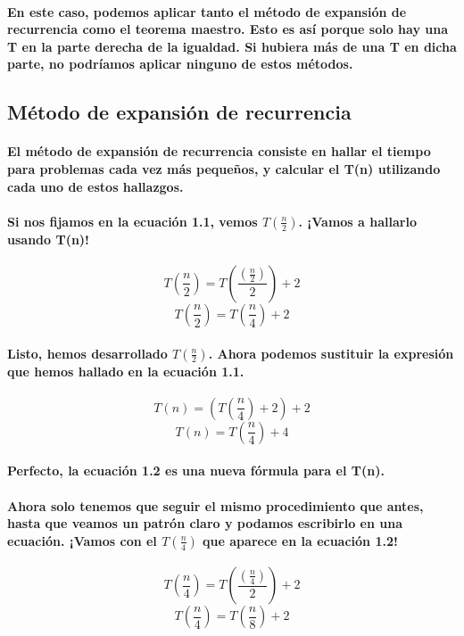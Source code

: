 \documentclass{book}
\begin{document}
      \paragraph{En este caso, podemos aplicar tanto el método de expansión de recurrencia como el teorema maestro. Esto es así porque solo hay una T en la parte derecha de la igualdad. Si hubiera más de una T en dicha parte, no podríamos aplicar ninguno de estos métodos.}
      \subsection{Método de expansión de recurrencia}
      \paragraph{El método de expansión de recurrencia consiste en hallar el tiempo para problemas cada vez más pequeños, y calcular el T(n) utilizando cada uno de estos hallazgos.}
      \paragraph{Si nos fijamos en la ecuación 1.1, vemos $T(\frac{n}{2})$. ¡Vamos a hallarlo usando T(n)!}
	\begin{equation}	
		T(\frac{n}{2}) = T(\frac{(\frac{n}{2})}{2}) + 2 \nonumber
	\end{equation}	
	\begin{equation}	
		T(\frac{n}{2}) = T(\frac{n}{4}) + 2 \nonumber 
	\end{equation}	
	\paragraph{Listo, hemos desarrollado $T(\frac{n}{2})$. Ahora podemos sustituir la expresión que hemos hallado en la ecuación 1.1.}
	\begin{equation}	
		T(n) = (T(\frac{n}{4}) + 2) + 2 \nonumber 
	\end{equation}	
	\begin{equation}	
		T(n) = T(\frac{n}{4}) + 4 
	\end{equation}	
	\paragraph{Perfecto, la ecuación 1.2 es una nueva fórmula para el T(n).}
	\paragraph{Ahora solo tenemos que seguir el mismo procedimiento que antes, hasta que veamos un patrón claro y podamos escribirlo en una ecuación. ¡Vamos con el $T(\frac{n}{4})$ que aparece en la ecuación 1.2!}
	\begin{equation}	
		T(\frac{n}{4}) = T(\frac{(\frac{n}{4})}{2}) + 2 \nonumber 
	\end{equation}
	\begin{equation}
		T(\frac{n}{4}) = T(\frac{n}{8}) + 2 \nonumber 
	\end{equation}
\end{document}
